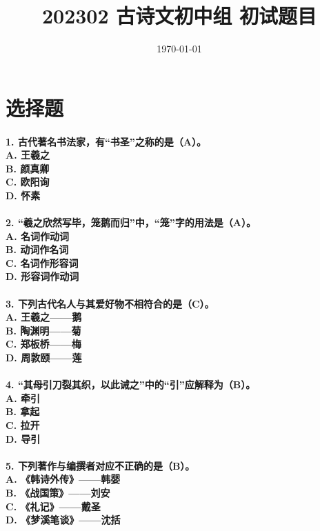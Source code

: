 \documentclass[UTF8]{ctexart} %
\title{202302 古诗文初中组 初试题目}
\date{\today}
\begin{document}
\maketitle
\newpage
\setcounter{page}{1}
\section{选择题}
\paragraph{
1. 古代著名书法家，有“书圣”之称的是（\color{red}A\color{black}）。 \\
    A. 王羲之 \\
    B. 颜真卿 \\
    C. 欧阳询 \\
    D. 怀素
}
\paragraph{
2. “羲之欣然写毕，笼鹅而归”中，“笼”字的用法是（\color{red}A\color{black}）。 \\
    A. 名词作动词 \\
    B. 动词作名词 \\
    C. 名词作形容词 \\
    D. 形容词作动词
}
\paragraph{
3. 下列古代名人与其爱好物不相符合的是（\color{red}C\color{black}）。 \\
    A. 王羲之——鹅 \\
    B. 陶渊明——菊 \\
    C. 郑板桥——梅 \\
    D. 周敦颐——莲
}
\paragraph{
4. “其母引刀裂其织，以此诫之”中的“引”应解释为（\color{red}B\color{black}）。 \\
    A. 牵引 \\
    B. 拿起 \\
    C. 拉开 \\
    D. 导引
}
\paragraph{
5. 下列著作与编撰者对应不正确的是（\color{red}B\color{black}）。 \\
    A. 《韩诗外传》——韩婴 \\
    B. 《战国策》——刘安 \\
    C. 《礼记》——戴圣 \\
    D. 《梦溪笔谈》——沈括
}
\end{document}
